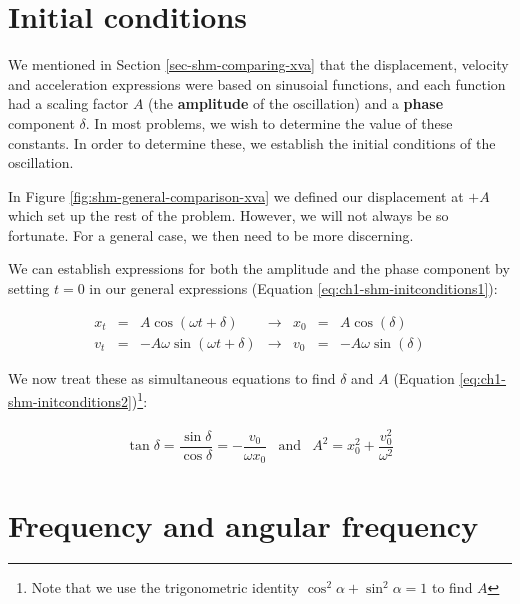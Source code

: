 \documentclass[
]{book}
\begin{document}
\hypertarget{sec-shm-initialconditions}{%
\section{Initial conditions}\label{sec-shm-initialconditions}}

We mentioned in Section \ref{sec-shm-comparing-xva} that the displacement, velocity and acceleration expressions were based on sinusoial functions, and each function had a scaling factor \(A\) (the \textbf{amplitude} of the oscillation) and a \textbf{phase} component \(\delta\). In most problems, we wish to determine the value of these constants. In order to determine these, we establish the initial conditions of the oscillation.

In Figure \ref{fig:shm-general-comparison-xva} we defined our displacement at \(+A\) which set up the rest of the problem. However, we will not always be so fortunate. For a general case, we then need to be more discerning.

We can establish expressions for both the amplitude and the phase component by setting \(t = 0\) in our general expressions (Equation \eqref{eq:ch1-shm-initconditions1}):

\begin{equation}
\begin{array}{rclcrcl}
x_t &=& A  \cos (\omega t + \delta)       & \rightarrow & x_0 &=& A  \cos (\delta)\\
v_t &=& -A \omega \sin (\omega t + \delta)& \rightarrow & v_0 &=& -A \omega \sin ( \delta)
\end{array}
\label{eq:ch1-shm-initconditions1}
\end{equation}

We now treat these as simultaneous equations to find \(\delta\) and \(A\) (Equation \eqref{eq:ch1-shm-initconditions2})\footnote{Note that we use the trigonometric identity \(\cos^2 \alpha + \sin^2 \alpha = 1\) to find \(A\)}:

\begin{equation}
\begin{array}{rcl}
\tan \delta = \dfrac{\sin \delta}{\cos \delta} = -\dfrac{v_0}{\omega x_0} & \textrm{and} & A^2 = x_0^2 + \dfrac{v_0^2}{\omega^2}
\end{array}
\label{eq:ch1-shm-initconditions2}
\end{equation}

\hypertarget{sec-shm-freq-angularfreq}{%
\section{Frequency and angular frequency}\label{sec-shm-freq-angularfreq}}
\end{document}
